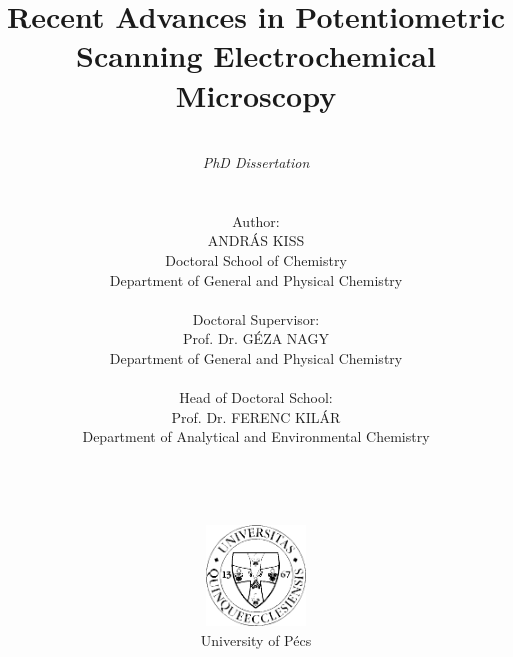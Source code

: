 \pagestyle{empty}

\title{\textbf{Recent Advances in Potentiometric Scanning Electrochemical Microscopy}}

\author{\\ \emph{PhD Dissertation} \\ \\ \\ Author: \\ ANDRÁS KISS \\ Doctoral School of Chemistry \\ Department of General and Physical Chemistry \\ \\ Doctoral Supervisor: \\ Prof. Dr. GÉZA NAGY
\\ Department of General and Physical Chemistry \\
\\ Head of Doctoral School: \\
Prof. Dr. FERENC KILÁR\\
Department of Analytical and Environmental Chemistry \\
\\ \\ \\ \\
\includegraphics[width=0.2\textwidth]{img/pte_logo.eps} \\
University of Pécs}
\maketitle
\pagestyle{plain}

\large
\setcounter{tocdepth}{4}
\tableofcontents
